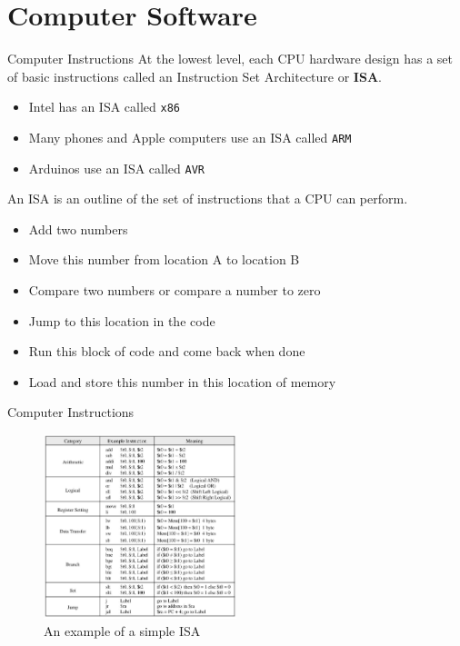 \documentclass[aspectratio=169]{beamer}
\begin{document}
\section{Computer Software}

\begin{frame}{Computer Instructions}
    At the lowest level, each CPU hardware design has a set of basic instructions called an Instruction Set Architecture or \textbf{ISA}.
    
    \begin{itemize}
        \item Intel has an ISA called \texttt{x86}
        \item Many phones and Apple computers use an ISA called \texttt{ARM}
        \item Arduinos use an ISA called \texttt{AVR}
    \end{itemize}
    
    An ISA is an outline of the set of instructions that a CPU can perform.
    \begin{itemize}
        \item Add two numbers
        \item Move this number from location A to location B
        \item Compare two numbers or compare a number to zero
        \item Jump to this location in the code
        \item Run this block of code and come back when done
        \item Load and store this number in this location of memory
    \end{itemize}

\end{frame}

\begin{frame}{Computer Instructions}
    \begin{figure}
        \centering
        \includegraphics[width=0.5\textwidth]{imgs/vis_6.png}
        \\
        An example of a simple ISA
    \end{figure}
\end{frame}
\end{document}
